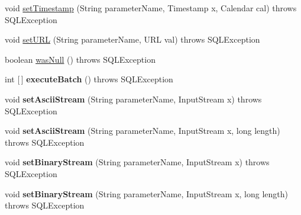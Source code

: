 \begin{DoxyCompactItemize}
\item 
void \mbox{\hyperlink{classcom_1_1mysql_1_1jdbc_1_1_callable_statement_a42215831c39b5cfa589e7e2906f1de17}{set\+Timestamp}} (String parameter\+Name, Timestamp x, Calendar cal)  throws S\+Q\+L\+Exception 
\item 
void \mbox{\hyperlink{classcom_1_1mysql_1_1jdbc_1_1_callable_statement_ad04fcf69ca66624f4c2dd44fcee0d8cc}{set\+U\+RL}} (String parameter\+Name, U\+RL val)  throws S\+Q\+L\+Exception 
\item 
boolean \mbox{\hyperlink{classcom_1_1mysql_1_1jdbc_1_1_callable_statement_affe08c14046e4beec81956a7dc445dc3}{was\+Null}} ()  throws S\+Q\+L\+Exception 
\item 
\mbox{\label{classcom_1_1mysql_1_1jdbc_1_1_callable_statement_a07b894c5b3a3226fecd42203eac95966}} 
int \mbox{[}$\,$\mbox{]} {\bfseries execute\+Batch} ()  throws S\+Q\+L\+Exception 
\item 
\mbox{\label{classcom_1_1mysql_1_1jdbc_1_1_callable_statement_a98162fc72c6c28408b7be401a133ffac}} 
void {\bfseries set\+Ascii\+Stream} (String parameter\+Name, Input\+Stream x)  throws S\+Q\+L\+Exception 
\item 
\mbox{\label{classcom_1_1mysql_1_1jdbc_1_1_callable_statement_a0fb334ab59c93a883229fda4c71c1f5e}} 
void {\bfseries set\+Ascii\+Stream} (String parameter\+Name, Input\+Stream x, long length)  throws S\+Q\+L\+Exception 
\item 
\mbox{\label{classcom_1_1mysql_1_1jdbc_1_1_callable_statement_a02bf9b25e030f8269e56bcf4204865a1}} 
void {\bfseries set\+Binary\+Stream} (String parameter\+Name, Input\+Stream x)  throws S\+Q\+L\+Exception 
\item 
\mbox{\label{classcom_1_1mysql_1_1jdbc_1_1_callable_statement_a42d1a6f1b0a592197af7922b1faff560}} 
void {\bfseries set\+Binary\+Stream} (String parameter\+Name, Input\+Stream x, long length)  throws S\+Q\+L\+Exception 
\item 
\mbox{\label{classcom_1_1mysql_1_1jdbc_1_1_callable_statement_ad441a32b07f66460598d9d0603496abf}} 

\end{DoxyCompactItemize}

